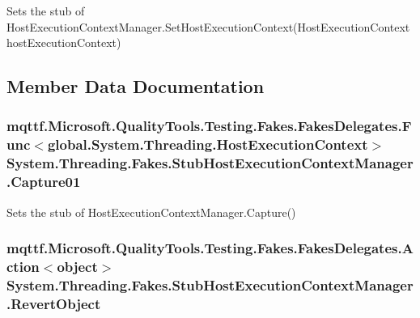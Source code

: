 Sets the stub of Host\-Execution\-Context\-Manager.\-Set\-Host\-Execution\-Context(\-Host\-Execution\-Context host\-Execution\-Context)



\subsection{Member Data Documentation}
\hypertarget{class_system_1_1_threading_1_1_fakes_1_1_stub_host_execution_context_manager_a85038b35a1b8cc8d6dd85878effcacff}{
\subsubsection[{Capture01}]{\setlength{\rightskip}{0pt plus 5cm}mqttf.\-Microsoft.\-Quality\-Tools.\-Testing.\-Fakes.\-Fakes\-Delegates.\-Func$<$global.\-System.\-Threading.\-Host\-Execution\-Context$>$ System.\-Threading.\-Fakes.\-Stub\-Host\-Execution\-Context\-Manager.\-Capture01}}\label{class_system_1_1_threading_1_1_fakes_1_1_stub_host_execution_context_manager_a85038b35a1b8cc8d6dd85878effcacff}


Sets the stub of Host\-Execution\-Context\-Manager.\-Capture()

\hypertarget{class_system_1_1_threading_1_1_fakes_1_1_stub_host_execution_context_manager_a97b8a82065f7c160cc6d428b16c99a64}{
\subsubsection[{Revert\-Object}]{\setlength{\rightskip}{0pt plus 5cm}mqttf.\-Microsoft.\-Quality\-Tools.\-Testing.\-Fakes.\-Fakes\-Delegates.\-Action$<$object$>$ System.\-Threading.\-Fakes.\-Stub\-Host\-Execution\-Context\-Manager.\-Revert\-Object}}\label{class_system_1_1_threading_1_1_fakes_1_1_stub_host_execution_context_manager_a97b8a82065f7c160cc6d428b16c99a64}


